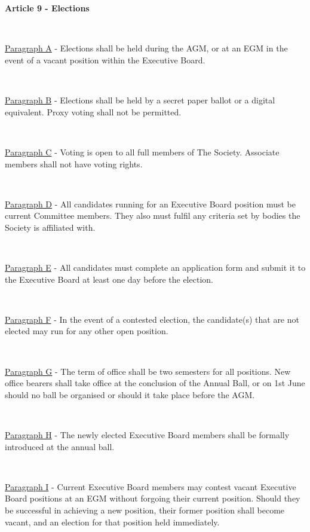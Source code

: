 ~

~

\newpage

\large{\textbf{Article 9 - Elections}}

~

\underline{Paragraph A} - Elections shall be held during the AGM, or at an EGM in
the event of a vacant position within the Executive Board.

~

\underline{Paragraph B} - Elections shall be held by a secret paper ballot or a digital equivalent. 
Proxy voting shall not be permitted.

~

\underline{Paragraph C} - Voting is open to all full members of The
Society. Associate members shall not have voting rights.

~

\underline{Paragraph D} - All candidates running for an Executive Board position
must be current Committee members. They also must fulfil any criteria set by bodies the Society is affiliated with.

~

\underline{Paragraph E} - All candidates must complete an application
form and submit it to the Executive Board at least one day before the
election.

~

\underline{Paragraph F} - In the event of a contested election, the
candidate(s) that are not elected may run for any other open position.

~

\underline{Paragraph G} - The term of office shall be two semesters for
all positions. New office bearers shall take office at the conclusion of the Annual Ball,
or on 1st June should no ball be organised or should it take place before the AGM.


~

\underline{Paragraph H} - The newly elected Executive Board members
shall be formally introduced at the annual ball.

~

\underline{Paragraph I} - Current Executive Board members may contest vacant Executive Board positions at an EGM
without forgoing their current position. Should they be successful in achieving a new position, their former position
shall become vacant, and an election for that position held immediately.

~

\newpage


